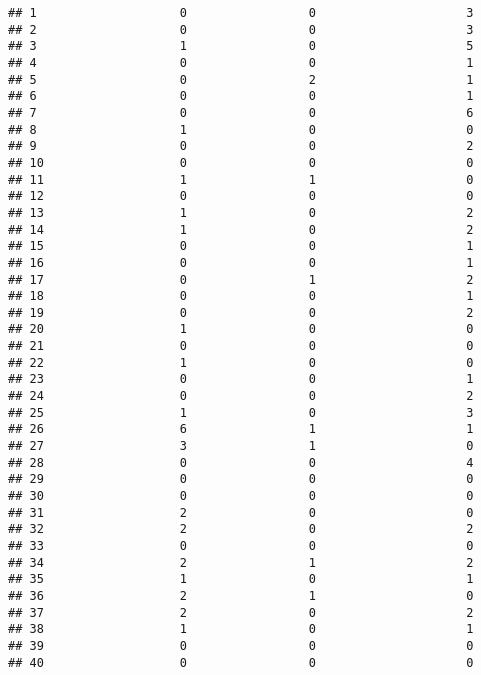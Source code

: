 \documentclass[
]{article}
\begin{document}
\begin{verbatim}
## 1                    0                 0                     3
## 2                    0                 0                     3
## 3                    1                 0                     5
## 4                    0                 0                     1
## 5                    0                 2                     1
## 6                    0                 0                     1
## 7                    0                 0                     6
## 8                    1                 0                     0
## 9                    0                 0                     2
## 10                   0                 0                     0
## 11                   1                 1                     0
## 12                   0                 0                     0
## 13                   1                 0                     2
## 14                   1                 0                     2
## 15                   0                 0                     1
## 16                   0                 0                     1
## 17                   0                 1                     2
## 18                   0                 0                     1
## 19                   0                 0                     2
## 20                   1                 0                     0
## 21                   0                 0                     0
## 22                   1                 0                     0
## 23                   0                 0                     1
## 24                   0                 0                     2
## 25                   1                 0                     3
## 26                   6                 1                     1
## 27                   3                 1                     0
## 28                   0                 0                     4
## 29                   0                 0                     0
## 30                   0                 0                     0
## 31                   2                 0                     0
## 32                   2                 0                     2
## 33                   0                 0                     0
## 34                   2                 1                     2
## 35                   1                 0                     1
## 36                   2                 1                     0
## 37                   2                 0                     2
## 38                   1                 0                     1
## 39                   0                 0                     0
## 40                   0                 0                     0

\end{verbatim}
\end{document}
